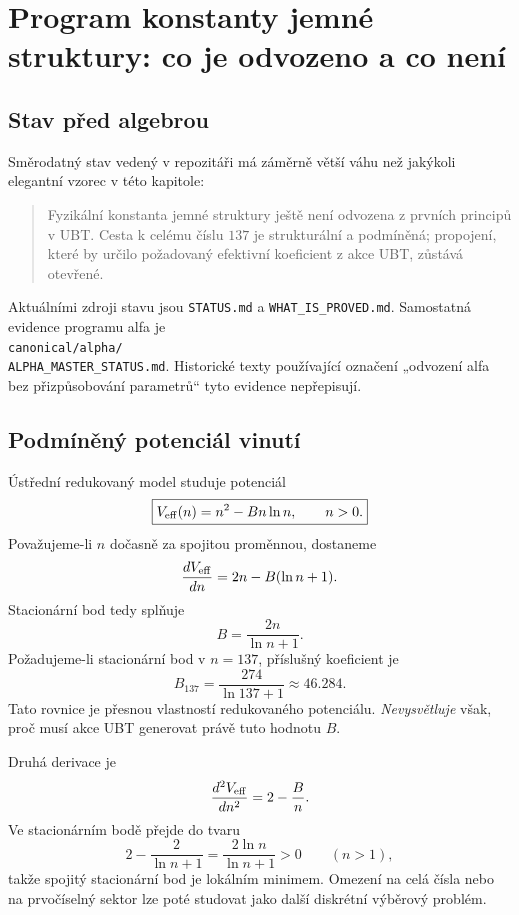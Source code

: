 
\chapter{Program konstanty jemné struktury: co je odvozeno a co není}
\label{ch:alpha}

\section{Stav před algebrou}
Směrodatný stav vedený v repozitáři má záměrně větší váhu než jakýkoli elegantní
vzorec v této kapitole:
\begin{quote}
Fyzikální konstanta jemné struktury ještě není odvozena z prvních principů
v UBT. Cesta k celému číslu $137$ je strukturální a podmíněná; propojení, které
by určilo požadovaný efektivní koeficient z akce UBT, zůstává otevřené.
\end{quote}
Aktuálními zdroji stavu jsou \texttt{STATUS.md} a
\texttt{WHAT\_IS\_PROVED.md}. Samostatná evidence programu alfa je\\
\texttt{canonical/alpha/}\\
\texttt{ALPHA\_MASTER\_STATUS.md}. Historické texty používající
označení „odvození alfa bez přizpůsobování parametrů“ tyto evidence nepřepisují.

\section{Podmíněný potenciál vinutí}
Ústřední redukovaný model studuje potenciál
\[
 \boxed{V_{\rm eff}(n)=n^2-Bn\ln n,\qquad n>0.}
\]
Považujeme-li $n$ dočasně za spojitou proměnnou, dostaneme
\[
 \frac{dV_{\rm eff}}{dn}
 =2n-B(\ln n+1).
\]
Stacionární bod tedy splňuje
\[
 \boxed{B=\frac{2n}{\ln n+1}.}
\]
Požadujeme-li stacionární bod v $n=137$, příslušný koeficient je
\[
 B_{137}=\frac{274}{\ln137+1}\approx46.284.
\]
Tato rovnice je přesnou vlastností redukovaného potenciálu. \emph{Nevysvětluje}
však, proč musí akce UBT generovat právě tuto hodnotu $B$.

Druhá derivace je
\[
 \frac{d^2V_{\rm eff}}{dn^2}=2-\frac{B}{n}.
\]
Ve stacionárním bodě přejde do tvaru
\[
 2-\frac{2}{\ln n+1}
 =\frac{2\ln n}{\ln n+1}>0
 \qquad(n>1),
\]
takže spojitý stacionární bod je lokálním minimem. Omezení na celá čísla nebo
na prvočíselný sektor lze poté studovat jako další diskrétní výběrový problém.

